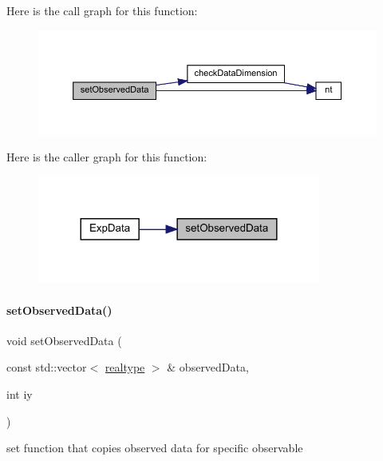 Here is the call graph for this function\+:
\nopagebreak
\begin{figure}[H]
\begin{center}
\leavevmode
\includegraphics[width=350pt]{classamici_1_1_exp_data_a85ca23791c279fe94e5d9f8e528ca63e_cgraph}
\end{center}
\end{figure}
Here is the caller graph for this function\+:
\nopagebreak
\begin{figure}[H]
\begin{center}
\leavevmode
\includegraphics[width=264pt]{classamici_1_1_exp_data_a85ca23791c279fe94e5d9f8e528ca63e_icgraph}
\end{center}
\end{figure}
\mbox{\label{classamici_1_1_exp_data_a814827d61da6c675276758c856faf794}} 
\paragraph{\texorpdfstring{setObservedData()}{setObservedData()}\hspace{0.1cm}{\footnotesize\ttfamily [2/2]}}
{\footnotesize\ttfamily void set\+Observed\+Data (\begin{DoxyParamCaption}\item[{const std\+::vector$<$ \mbox{\hyperlink{namespaceamici_a1bdce28051d6a53868f7ccbf5f2c14a3}{realtype}} $>$ \&}]{observed\+Data,  }\item[{int}]{iy }\end{DoxyParamCaption})}

set function that copies observed data for specific observable


